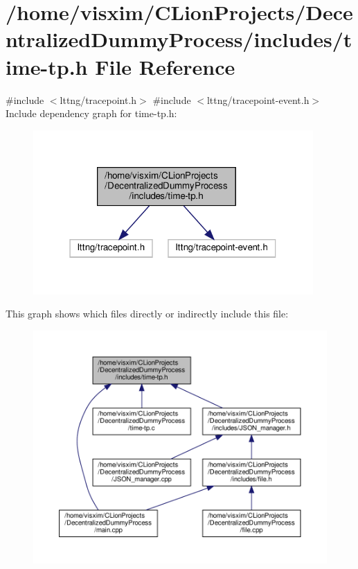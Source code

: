 \hypertarget{time-tp_8h}{}\section{/home/visxim/\+C\+Lion\+Projects/\+Decentralized\+Dummy\+Process/includes/time-\/tp.h File Reference}
\label{time-tp_8h}
{\ttfamily \#include $<$lttng/tracepoint.\+h$>$}\newline
{\ttfamily \#include $<$lttng/tracepoint-\/event.\+h$>$}\newline
Include dependency graph for time-\/tp.h\+:
\nopagebreak
\begin{figure}[H]
\begin{center}
\leavevmode
\includegraphics[width=303pt]{time-tp_8h__incl}
\end{center}
\end{figure}
This graph shows which files directly or indirectly include this file\+:
\nopagebreak
\begin{figure}[H]
\begin{center}
\leavevmode
\includegraphics[width=350pt]{time-tp_8h__dep__incl}
\end{center}
\end{figure}
